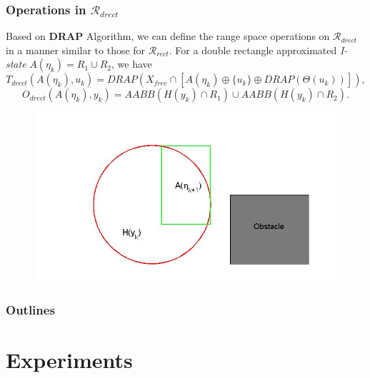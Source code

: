 \documentclass[compress]{beamer}
\begin{document}
\begin{frame} \frametitle{Operations in $\mathcal{R}_{drect}$}

Based on \textbf{DRAP} Algorithm, we can define the range space operations on
$\mathcal{R}_{drect}$ in a manner similar to those for $\mathcal{R}_{rect}$.  For a double rectangle
approximated \emph{I-state} $A(\eta_k) = R_1 \cup R_2$, we have
\begin{equation}
	T_{drect}(A(\eta_k), u_k) = DRAP(X_{free} \cap [A(\eta_k) \oplus \{ u_k \} \oplus DRAP(\Theta(u_k))]),
\end{equation}
\begin{equation}
	O_{drect}(A(\eta_k), y_k) = AABB(H(y_k) \cap R_1)\cup AABB(H(y_k) \cap R_2).
\end{equation}
\begin{figure}
    \includegraphics[scale=0.3]{drectevolve5.jpg}
    \end{figure}
\transboxout
\end{frame}

\begin{frame}
  \frametitle{Outlines}
  \tableofcontents[]
  \transboxout
\end{frame}
\section[Experiments]{Experiments}
\end{document}

